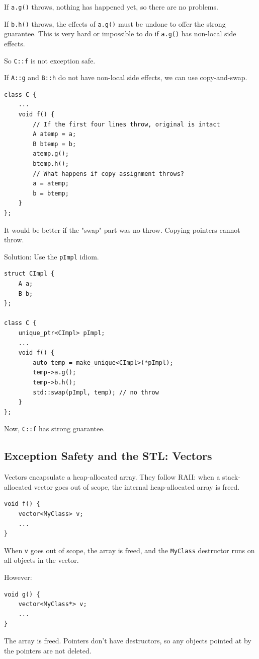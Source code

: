 \documentclass[11pt]{article}
\theoremstyle{definition}
\begin{document}
If {\tt a.g()} throws, nothing has happened yet, so there are no problems.

If {\tt b.h()} throws, the effects of {\tt a.g()} must be undone to offer the strong guarantee. This is very hard or impossible to do if {\tt a.g()} has non-local side effects.

So {\tt C::f} is not exception safe. 

If {\tt A::g} and {\tt B::h} do not have non-local side effects, we can use copy-and-swap.
\begin{lstlisting}
class C {
    ...
    void f() {
        // If the first four lines throw, original is intact
        A atemp = a;
        B btemp = b;
        atemp.g();
        btemp.h();
        // What happens if copy assignment throws?
        a = atemp;
        b = btemp;
    }
};
\end{lstlisting}
\vspace{-1.5ex}
It would be better if the "swap" part was no-throw. Copying pointers cannot throw.

Solution: Use the {\tt pImpl} idiom.
\begin{lstlisting}
struct CImpl {
    A a;
    B b;
};

class C {
    unique_ptr<CImpl> pImpl;
    ...
    void f() {
        auto temp = make_unique<CImpl>(*pImpl);
        temp->a.g();
        temp->b.h();
        std::swap(pImpl, temp); // no throw
    }
};
\end{lstlisting}
\vspace{-1.5ex}
Now, {\tt C::f} has strong guarantee.

\subsection{Exception Safety and the STL: Vectors}
Vectors encapsulate a heap-allocated array. They follow RAII: when a stack-allocated vector goes out of scope, the internal heap-allocated array is freed.
\begin{lstlisting}
void f() {
    vector<MyClass> v;
    ...
}
\end{lstlisting}
\vspace{-1.5ex}
When {\tt v} goes out of scope, the array is freed, and the {\tt MyClass} destructor runs on all objects in the vector.

However:
\begin{lstlisting}
void g() {
    vector<MyClass*> v;
    ...
}
\end{lstlisting}
\vspace{-1.5ex}
The array is freed. Pointers don't have destructors, so any objects pointed at by the pointers are not deleted.
\end{document}
